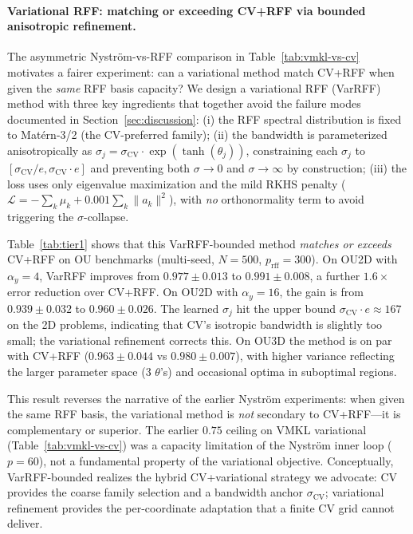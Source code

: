 \documentclass[11pt]{article}
\theoremstyle{remark}
\begin{document}
\paragraph{Variational RFF: matching or exceeding CV+RFF via bounded anisotropic refinement.}
The asymmetric Nystr\"om-vs-RFF comparison in Table~\ref{tab:vmkl-vs-cv} motivates a fairer experiment: can a variational method match CV+RFF when given the \emph{same} RFF basis capacity?
We design a variational RFF (VarRFF) method with three key ingredients that together avoid the failure modes documented in Section~\ref{sec:discussion}:
(i) the RFF spectral distribution is fixed to Mat\'ern-3/2 (the CV-preferred family);
(ii) the bandwidth is parameterized anisotropically as $\sigma_j = \sigma_{\mathrm{CV}}\cdot\exp(\tanh(\theta_j))$, constraining each $\sigma_j$ to $[\sigma_{\mathrm{CV}}/e,\sigma_{\mathrm{CV}}\cdot e]$ and preventing both $\sigma\to 0$ and $\sigma\to\infty$ by construction;
(iii) the loss uses only eigenvalue maximization and the mild RKHS penalty ($\mathcal{L}=-\sum_k\mu_k + 0.001\sum_k\|a_k\|^2$), with \emph{no} orthonormality term to avoid triggering the $\sigma$-collapse.

Table~\ref{tab:tier1} shows that this VarRFF-bounded method \emph{matches or exceeds} CV+RFF on OU benchmarks (multi-seed, $N\!=\!500$, $p_{\mathrm{rff}}=300$).
On OU2D with $\alpha_y=4$, VarRFF improves from $0.977\pm0.013$ to $0.991\pm0.008$, a further $1.6\times$ error reduction over CV+RFF.
On OU2D with $\alpha_y=16$, the gain is from $0.939\pm0.032$ to $0.960\pm0.026$.
The learned $\sigma_j$ hit the upper bound $\sigma_{\mathrm{CV}}\cdot e\approx 167$ on the 2D problems, indicating that CV's isotropic bandwidth is slightly too small; the variational refinement corrects this.
On OU3D the method is on par with CV+RFF ($0.963\pm0.044$ vs $0.980\pm0.007$), with higher variance reflecting the larger parameter space (3 $\theta$'s) and occasional optima in suboptimal regions.

This result reverses the narrative of the earlier Nystr\"om experiments: when given the same RFF basis, the variational method is \emph{not} secondary to CV+RFF---it is complementary or superior. The earlier $0.75$ ceiling on VMKL variational (Table~\ref{tab:vmkl-vs-cv}) was a capacity limitation of the Nystr\"om inner loop ($p=60$), not a fundamental property of the variational objective. Conceptually, VarRFF-bounded realizes the hybrid CV+variational strategy we advocate: CV provides the coarse family selection and a bandwidth anchor $\sigma_{\mathrm{CV}}$; variational refinement provides the per-coordinate adaptation that a finite CV grid cannot deliver.
\end{document}
